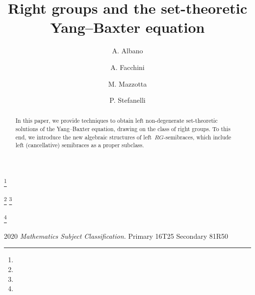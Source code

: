 \documentclass[11pt]{amsart}
\theoremstyle{definition}
\begin{document}
  \title{Right groups and the set-theoretic Yang--Baxter  equation}
  \author{A. Albano}
\address[Andrea Albano]{Dipartimento di Matematica  e Fisica ``Ennio De Giorgi'',\linebreak Università del Salento, 73100 Lecce, Italy}
     \author{A. Facchini}
\address[Alberto Facchini]{Dipartimento di Matematica ``Tullio Levi-Civita'',\linebreak Universit\`a di 
Padova, 35121 Padova, Italy}
\thanks{}
\author{M. Mazzotta}
\address[Marzia Mazzotta]{Dipartimento di Matematica e Fisica ``Ennio De Giorgi'', Università del Salento, 73100
Lecce, Italy}
\thanks{}
\thanks{}
\author{P. Stefanelli}
\address[Paola Stefanelli]{Dipartimento di Matematica e Fisica ``Ennio De Giorgi'', Università del Salento, 73100
Lecce, Italy}
\thanks{}


      \begin{abstract} 
      In this paper, we provide techniques to obtain left non-degenerate set-theoretic solutions of the Yang--Baxter equation, drawing on the class of right groups.
     To this end, we introduce the new algebraic structures of left~$RG$-se\-mi\-bra\-ces, which include left (cancellative) semibraces as a proper subclass.
      \end{abstract}

    \maketitle

{\small 2020 {\it Mathematics Subject Classification.} Primary 16T25 Secondary 81R50}
\end{document}
